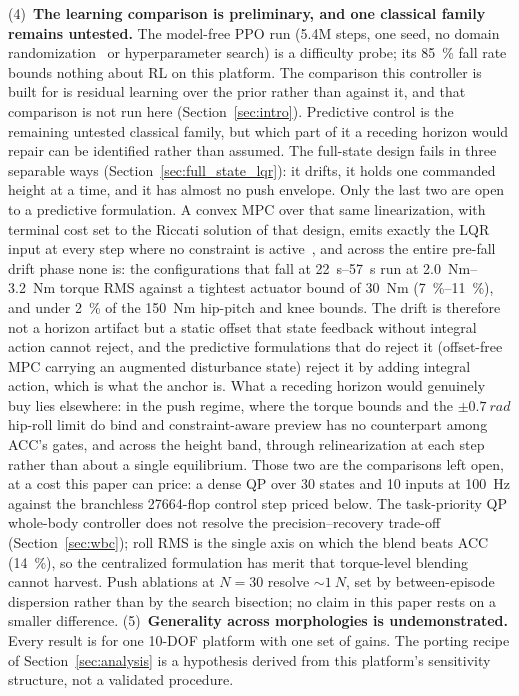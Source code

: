 \documentclass[a4paper,fleqn]{cas-dc}
\begin{document}
(4)~\textbf{The learning comparison is preliminary, and one classical family remains untested.} The model-free PPO run (5.4M steps, one seed, no domain randomization~\cite{tobin2017domainrand,peng2018dynrand} or hyperparameter search) is a difficulty probe; its \SI{85}{\percent} fall rate bounds nothing about RL on this platform. The comparison this controller is built for is residual learning over the prior rather than against it, and that comparison is not run here (Section~\ref{sec:intro}). Predictive control is the remaining untested classical family, but which part of it a receding horizon would repair can be identified rather than assumed. The full-state design fails in three separable ways (Section~\ref{sec:full_state_lqr}): it drifts, it holds one commanded height at a time, and it has almost no push envelope. Only the last two are open to a predictive formulation. A convex MPC over that same linearization, with terminal cost set to the Riccati solution of that design, emits exactly the LQR input at every step where no constraint is active~\cite{rawlings2017mpc}, and across the entire pre-fall drift phase none is: the configurations that fall at \SIrange{22}{57}{s} run at \SIrange{2.0}{3.2}{Nm} torque RMS against a tightest actuator bound of \SI{30}{Nm} (\SIrange{7}{11}{\percent}), and under \SI{2}{\percent} of the \SI{150}{Nm} hip-pitch and knee bounds. The drift is therefore not a horizon artifact but a static offset that state feedback without integral action cannot reject, and the predictive formulations that do reject it (offset-free MPC carrying an augmented disturbance state) reject it by adding integral action, which is what the anchor is. What a receding horizon would genuinely buy lies elsewhere: in the push regime, where the torque bounds and the $\pm\SI{0.7}{rad}$ hip-roll limit do bind and constraint-aware preview has no counterpart among ACC's gates, and across the height band, through relinearization at each step rather than about a single equilibrium. Those two are the comparisons left open, at a cost this paper can price: a dense QP over \num{30} states and \num{10} inputs at \SI{100}{Hz} against the branchless \num{27664}-flop control step priced below. The task-priority QP whole-body controller does not resolve the precision--recovery trade-off (Section~\ref{sec:wbc}); roll RMS is the single axis on which the blend beats ACC (\SI{14}{\percent}), so the centralized formulation has merit that torque-level blending cannot harvest. Push ablations at $N{=}30$ resolve ${\sim}\SI{1}{N}$, set by between-episode dispersion rather than by the search bisection; no claim in this paper rests on a smaller difference.
(5)~\textbf{Generality across morphologies is undemonstrated.} Every result is for one 10-DOF platform with one set of gains. The porting recipe of Section~\ref{sec:analysis} is a hypothesis derived from this platform's sensitivity structure, not a validated procedure.
\end{document}

